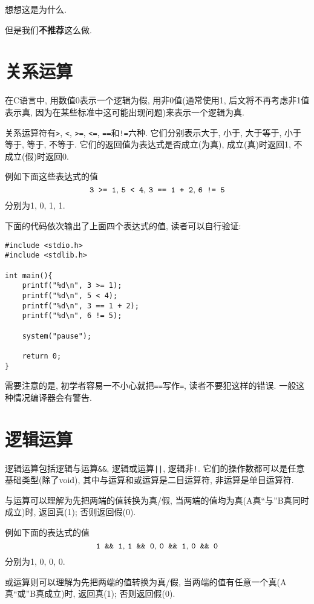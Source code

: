         想想这是为什么.

        但是我们\textbf{不推荐}这么做.

    \section{关系运算}
        在C语言中, 用数值0表示一个逻辑为假, 用非0值(通常使用1, 后文将不再考虑非1值表示真, 因为在某些标准中这可能出现问题)来表示一个逻辑为真.

        关系运算符有\texttt{>}, \texttt{<}, \texttt{>=}, \texttt{<=}, \texttt{==}和\texttt{!=}六种. 它们分别表示大于, 小于, 大于等于, 小于等于, 等于, 不等于. 它们的返回值为表达式是否成立(为真), 成立(真)时返回1, 不成立(假)时返回0.
        
        例如下面这些表达式的值
            \[\mbox{\texttt{3 >= 1},  \texttt{5 < 4},  \texttt{3 == 1 + 2},  \texttt{6 != 5}} \]
        分别为1, 0, 1, 1.

        下面的代码依次输出了上面四个表达式的值, 读者可以自行验证:
\begin{lstlisting}
#include <stdio.h>
#include <stdlib.h>
    
int main(){
    printf("%d\n", 3 >= 1);
    printf("%d\n", 5 < 4);
    printf("%d\n", 3 == 1 + 2);
    printf("%d\n", 6 != 5);

    system("pause");

    return 0;
}
\end{lstlisting}

        需要注意的是, 初学者容易一不小心就把\texttt{==}写作\texttt{=}, 读者不要犯这样的错误. 一般这种情况编译器会有警告.

    \section{逻辑运算}
        逻辑运算包括逻辑与运算\texttt{\&\&}, 逻辑或运算\texttt{||}, 逻辑非\texttt{!}. 它们的操作数都可以是任意基础类型(除了void), 其中与运算和或运算是二目运算符, 非运算是单目运算符.

        与运算可以理解为先把两端的值转换为真/假, 当两端的值均为真(A真``与''B真同时成立)时, 返回真(1); 否则返回假(0).

        例如下面的表达式的值
            \[ \mbox{\texttt{1 \&\& 1},  \texttt{1 \&\& 0},  \texttt{0 \&\& 1},  \texttt{0 \&\& 0}} \]
        分别为1, 0, 0, 0.

        或运算则可以理解为先把两端的值转换为真/假, 当两端的值有任意一个真(A真``或''B真成立)时, 返回真(1); 否则返回假(0).

